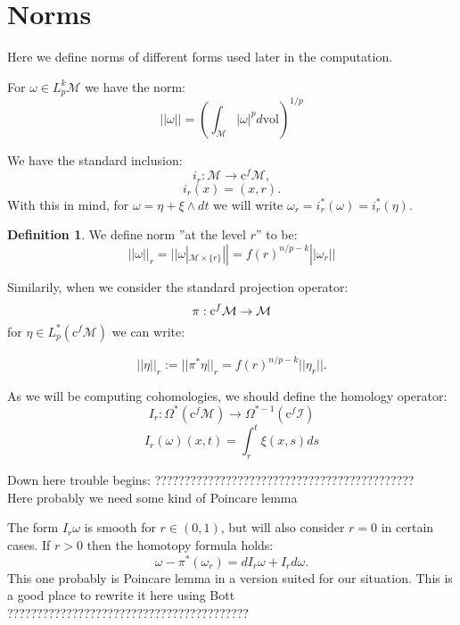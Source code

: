 \documentclass[licencjacka]{pracamgr}
\theoremstyle{definition}
\newtheorem{definition}{Definition}[section]
\theoremstyle{definition}
\theoremstyle{plain}
\theoremstyle{plain}
\def\cfm{\ensuremath\mathrm{c}^f\mathcal{M}}
\begin{document}
\section{Norms}
Here we define norms of different forms used later in the computation.

For $\omega \in L_p^k \mathcal{M}$ we have the norm:
\[
 || \omega || = ( \int_\mathcal{M} | \omega |^p d \text{vol} ) ^ {1/p}
\]


We have the standard inclusion:
\[
    i_r: \mathcal{M} \rightarrow \mathrm{c}^f \mathcal{M},
\]
\[
    i_r(x) = (x, r).
\]
With this in mind, for $\omega = \eta + \xi \wedge dt$
 we will write 
$\omega_r = i_r^\ast(\omega) =
i_r^\ast(\eta)$. 

\begin{definition}
  We define norm ''at the level $r$'' to be:
\[
  || \omega ||_r  = || \omega |_{\mathcal{M} \times
    \{r\}} || = f(r)^{n/p - k} ||\omega_r||
\]
\end{definition}

Similarily, when we consider the standard projection operator:
\[
    \pi:\cfm \rightarrow \mathcal{M}
\]
for $\eta \in L^\ast_p(\mathrm{c}^f\mathcal{M})$ we can write:

\[
 ||\eta||_r := ||\pi^\ast\eta||_r = f(r)^{n/p - k} ||\eta_r||.
 \]



As we will be computing cohomologies, we should define the homology
operator:
\[
  I_r: \Omega^\ast( \mathrm{c}^f \mathcal{M} ) \rightarrow
  \Omega^{\ast-1}(\mathrm{c}^f \mathcal{I} ) 
\]
\[
    I_r(\omega)(x, t) = \int_r^t \xi(x, s) ds
\]

Down here trouble begins:
????????????????????????????????????????????\\
Here probably we need some kind of Poincare lemma

The form $I_r\omega$ is smooth for $r \in (0,1)$, but will also consider
$r=0$ in certain cases. If $r>0$ then the homotopy formula holds:
\[
    \omega - \pi^\ast(\omega_r) = d I_r\omega + I_rd\omega.
\] 
This one probably is Poincare lemma in a version suited for our situation.
This is a good place to rewrite it here using Bott \\ 
????????????????????????????????????????? \\
\end{document}
